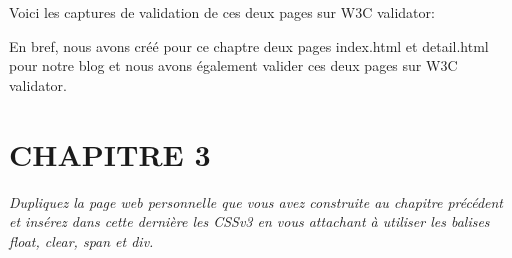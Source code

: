 \documentclass[a4paper,11pt]{article}
\begin{document}
        \newpage
        \noindent Voici les captures de validation de ces deux pages sur W3C validator: 

        \begin{figure}[ht]
        \end{figure}

        \begin{figure}[ht]
        \end{figure}

        \bigskip
        \begin{tcolorbox}[colback=lightgray!6, colframe=black, left=5mm, right=5mm, top=2mm, bottom=2mm, boxrule=0.1mm]
            En bref, nous avons créé pour ce chaptre deux pages index.html et detail.html
            pour notre blog et nous avons également valider ces deux pages sur W3C validator.
        \end{tcolorbox}

    \newpage
    \section{CHAPITRE 3}
        \noindent \textit{Dupliquez la page web personnelle que vous avez construite
        au chapitre précédent et insérez dans cette dernière les CSSv3 en
        vous attachant à utiliser les balises float, clear, span et div.}
        
\end{document}
